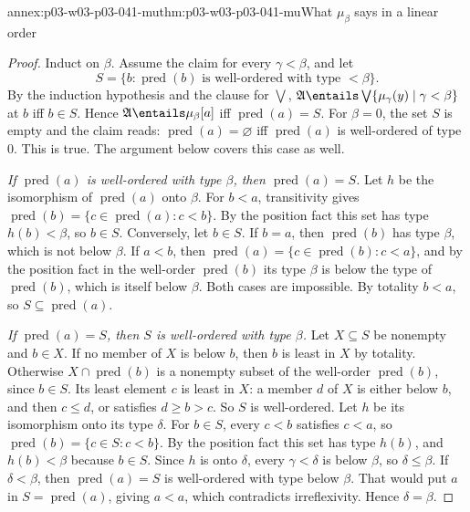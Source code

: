 \begin{annexitem}{annex:p03-w03-p03-041-mu}{thm:p03-w03-p03-041-mu}{What \(\mu_\beta\) says in a linear order}
\begin{proof}
Induct on \(\beta\). Assume the claim for every \(\gamma<\beta\), and let
\[
 S=\{b:\operatorname{pred}(b)\text{ is well-ordered with type }<\beta\}.
\]
By the induction hypothesis and the clause for \(\bigvee\),
\(\mathfrak A\entails\bigvee\{\mu_\gamma(y)\mid\gamma<\beta\}\) at \(b\)
iff \(b\in S\). Hence \(\mathfrak A\entails\mu_\beta[a]\) iff
\(\operatorname{pred}(a)=S\). For \(\beta=0\), the set \(S\) is empty and
the claim reads: \(\operatorname{pred}(a)=\varnothing\) iff
\(\operatorname{pred}(a)\) is well-ordered of type \(0\). This is true.
The argument below covers this case as well.

\emph{If \(\operatorname{pred}(a)\) is well-ordered with type \(\beta\),
then \(\operatorname{pred}(a)=S\).} Let \(h\) be the isomorphism of
\(\operatorname{pred}(a)\) onto \(\beta\). For \(b<a\), transitivity gives
\(\operatorname{pred}(b)=\{c\in\operatorname{pred}(a):c<b\}\). By the
position fact this set has type \(h(b)<\beta\), so \(b\in S\). Conversely,
let \(b\in S\). If \(b=a\), then \(\operatorname{pred}(b)\) has type
\(\beta\), which is not below \(\beta\). If \(a<b\), then
\(\operatorname{pred}(a)=\{c\in\operatorname{pred}(b):c<a\}\), and by the
position fact in the well-order \(\operatorname{pred}(b)\) its type
\(\beta\) is below the type of \(\operatorname{pred}(b)\), which is itself
below \(\beta\). Both cases are impossible. By totality \(b<a\), so
\(S\subseteq\operatorname{pred}(a)\).

\emph{If \(\operatorname{pred}(a)=S\), then \(S\) is well-ordered with
type \(\beta\).} Let \(X\subseteq S\) be nonempty and \(b\in X\). If no
member of \(X\) is below \(b\), then \(b\) is least in \(X\) by totality.
Otherwise \(X\cap\operatorname{pred}(b)\) is a nonempty subset of the
well-order \(\operatorname{pred}(b)\), since \(b\in S\). Its least element
\(c\) is least in \(X\): a member \(d\) of \(X\) is either below \(b\),
and then \(c\leq d\), or satisfies \(d\geq b>c\). So \(S\) is
well-ordered. Let \(h\) be its isomorphism onto its type \(\delta\). For
\(b\in S\), every \(c<b\) satisfies \(c<a\), so
\(\operatorname{pred}(b)=\{c\in S:c<b\}\). By the position fact this set
has type \(h(b)\), and \(h(b)<\beta\) because \(b\in S\). Since \(h\) is
onto \(\delta\), every \(\gamma<\delta\) is below \(\beta\), so
\(\delta\leq\beta\). If \(\delta<\beta\), then \(\operatorname{pred}(a)=S\)
is well-ordered with type below \(\beta\). That would put \(a\) in
\(S=\operatorname{pred}(a)\), giving \(a<a\), which contradicts
irreflexivity. Hence \(\delta=\beta\).
\end{proof}
\end{annexitem}

